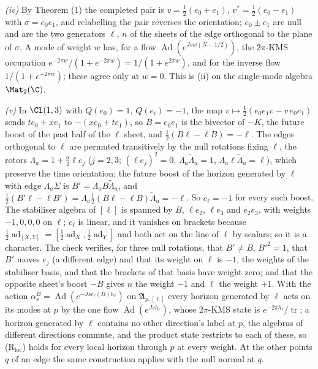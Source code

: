 \emph{(iv)} By Theorem (1) the completed pair is $v = \tfrac12(e_{0} + e_{1})$, $v^{*} = \tfrac12(e_{0} - e_{1})$ with $\sigma = e_{0}e_{1}$, and relabelling the pair reverses the orientation; $e_{0} \pm e_{1}$ are null and are the two generators $\ell$, $n$ of the sheets of the edge orthogonal to the plane of $\sigma$. A mode of weight $w$ has, for a flow $\operatorname{Ad}(e^{Jsw(N - 1/2)})$, the $2\pi$-KMS occupation $e^{-2\pi w}/(1 + e^{-2\pi w}) = 1/(1 + e^{2\pi w})$, and for the inverse flow $1/(1 + e^{-2\pi w})$; these agree only at $w = 0$. This is (ii) on the single-mode algebra $\Mat_{2}(\C)$.

\emph{(v)} In $\Cl(1,3)$ with $Q(e_{0}) = 1$, $Q(e_{i}) = -1$, the map $v \mapsto \tfrac12(e_{0}e_{1}v - v\,e_{0}e_{1})$ sends $te_{0} + xe_{1}$ to $-(xe_{0} + te_{1})$, so $B = e_{0}e_{1}$ is the bivector of $-K$, the future boost of the past half of the $\ell$ sheet, and $\tfrac12(B\ell - \ell B) = -\ell$. The edges orthogonal to $\ell$ are permuted transitively by the null rotations fixing $\ell$, the rotors $\Lambda_{a} = 1 + \tfrac{a}{2}\ell e_{j}$ ($j = 2, 3$; $(\ell e_{j})^{2} = 0$, $\Lambda_{a}\widetilde{\Lambda}_{a} = 1$, $\Lambda_{a}\ell\widetilde{\Lambda}_{a} = \ell$), which preserve the time orientation; the future boost of the horizon generated by $\ell$ with edge $\Lambda_{a}\Sigma$ is $B' = \Lambda_{a}B\widetilde{\Lambda}_{a}$, and $\tfrac12(B'\ell - \ell B') = \Lambda_{a}\tfrac12(B\ell - \ell B)\widetilde{\Lambda}_{a} = -\ell$. So $c_{\ell} = -1$ for every such boost. The stabiliser algebra of $[\ell]$ is spanned by $B$, $\ell e_{2}$, $\ell e_{3}$ and $e_{2}e_{3}$, with weights $-1, 0, 0, 0$ on $\ell$; $c_{\ell}$ is linear, and it vanishes on brackets because $\tfrac12\operatorname{ad}_{[X,Y]} = [\tfrac12\operatorname{ad}_{X}, \tfrac12\operatorname{ad}_{Y}]$ and both act on the line of $\ell$ by scalars; so it is a character. The check verifies, for three null rotations, that $B' \neq B$, $B'^{2} = 1$, that $B'$ moves $e_{j}$ (a different edge) and that its weight on $\ell$ is $-1$, the weights of the stabiliser basis, and that the brackets of that basis have weight zero; and that the opposite sheet's boost $-B$ gives $n$ the weight $-1$ and $\ell$ the weight $+1$. With the action $\alpha^{B}_{s} = \operatorname{Ad}(e^{-Jsc_{\ell}(B)h_{\ell}})$ on $\mathfrak{A}_{p,[\ell]}$ every horizon generated by $\ell$ acts on its modes at $p$ by the one flow $\operatorname{Ad}(e^{Jsh_{\ell}})$, whose $2\pi$-KMS state is $e^{-2\pi h_{\ell}}/\operatorname{tr}$; a horizon generated by $\ell$ contains no other direction's label at $p$, the algebras of different directions commute, and the product state restricts to each of these, so (R$_{\mathrm{loc}}$) holds for every local horizon through $p$ at every weight. At the other points $q$ of an edge the same construction applies with the null normal at $q$.

